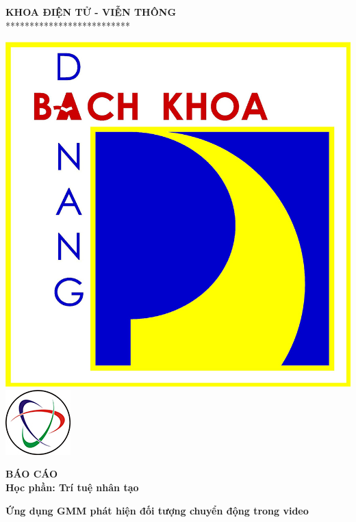 \documentclass[a4paper]{article}
\begin{document}
\begin{titlepage}
\begin{center}
    \vspace{7pt}
    \textbf{KHOA ĐIỆN TỬ - VIỄN THÔNG} \\
    **************************
\end{center}
\vspace{10pt}
\begin{center}
    \includegraphics[scale=0.37]{images/logodut.jpg}
    \includegraphics[scale=0.75]{images/logoete.jpg}
    
    \vspace{20pt}
    \fontsize{20pt}{17pt}\selectfont 
    \textbf{BÁO CÁO} \\
    \vspace{7pt}
    \textbf{Học phần: Trí tuệ nhân tạo}
    \vspace{7pt}

\end{center}
\begin{flushleft}
    \fontsize{15pt}{10pt}\selectfont  
    \textbf{\textsl{}}
\end{flushleft}
\begin{center}
    \hspace{10pt}
    \fontsize{17pt}{17pt}\selectfont 
    \textbf{\textrm{Ứng dụng GMM phát hiện đối tượng chuyển động trong video}}
\end{center}
\begin{center}
    \fontsize{16pt}{17pt}\selectfont 
    \textbf{\textrm{}}
\end{center}


\end{titlepage}
\end{document}
